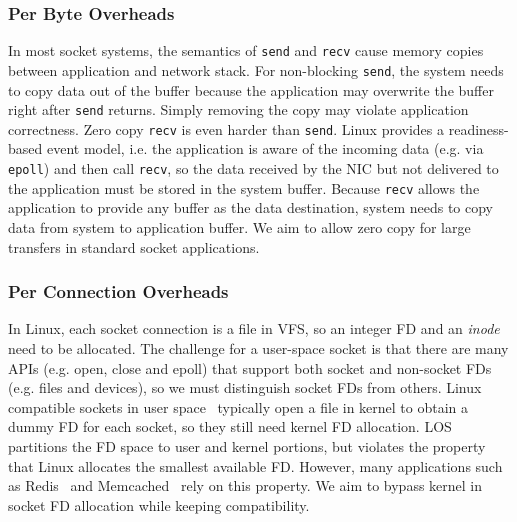 \subsubsection{Per Byte Overheads}
\label{socksdirect:subsec:per-byte-overhead}
\quad

In most socket systems, the semantics of \texttt{send} and \texttt{recv} cause memory copies between application and network stack. For non-blocking \texttt{send}, the system needs to copy data out of the buffer because the application may overwrite the buffer right after \texttt{send} returns. Simply removing the copy may violate application correctness.
Zero copy \texttt{recv} is even harder than \texttt{send}.
Linux provides a readiness-based event model, i.e. the application is aware of the incoming data (e.g. via \texttt{epoll}) and then call \texttt{recv}, so the data received by the NIC but not delivered to the application must be stored in the system buffer.
Because \texttt{recv} allows the application to provide any buffer as the data destination, system needs to copy data from system to application buffer. 
We aim to allow zero copy for large transfers in standard socket applications.



\subsubsection{Per Connection Overheads}
\label{socksdirect:subsec:per-connection-overhead}
\quad

In Linux, each socket connection is a file in VFS, so an integer FD and an \emph{inode} need to be allocated.
The challenge for a user-space socket is that there are many APIs (e.g. open, close and epoll) that support both socket and non-socket FDs (e.g. files and devices), so we must distinguish socket FDs from others.
Linux compatible sockets in user space~\cite{libvma,rsockets} typically open a file in kernel to obtain a dummy FD for each socket, so they still need kernel FD allocation.
LOS~\cite{huang2017high} partitions the FD space to user and kernel portions, but violates the property that Linux allocates the smallest available FD.
However, many applications such as Redis~\cite{redis} and Memcached~\cite{memcached} rely on this property.
We aim to bypass kernel in socket FD allocation while keeping compatibility.

